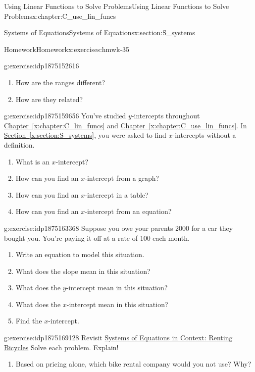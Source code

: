 \documentclass[oneside,10pt,]{book}
\newcommand{\xreffont}{\relax}
\numberwithin{equation}{chapter}
\begin{document}
\begin{chapterptx}{Using Linear Functions to Solve Problems}{}{Using Linear Functions to Solve Problems}{}{}{x:chapter:C_use_lin_funcs}
\begin{sectionptx}{Systems of Equations}{}{Systems of Equations}{}{}{x:section:S_systems}
\begin{exercises-subsection}{Homework}{}{Homework}{}{}{x:exercises:hmwk-35}
\begin{divisionexercise}{5}{}{}{g:exercise:idp1875152616}
\begin{enumerate}[font=\bfseries,label=(\alph*),ref=\alph*]
\item{}How are the ranges different?%
\item{}How are they related?%
\end{enumerate}
\end{divisionexercise}%
\begin{divisionexercise}{6}{}{}{g:exercise:idp1875159656}%
You've studied \(y\)-intercepts throughout \hyperref[x:chapter:C_lin_funcs]{Chapter~{\xreffont\ref{x:chapter:C_lin_funcs}}} and \hyperref[x:chapter:C_use_lin_funcs]{Chapter~{\xreffont\ref{x:chapter:C_use_lin_funcs}}}. In \hyperref[x:section:S_systems]{Section~{\xreffont\ref{x:section:S_systems}}}, you were asked to find \(x\)-intercepts without a definition.%
\begin{enumerate}[font=\bfseries,label=(\alph*),ref=\alph*]
\item{}What is an \(x\)-intercept?%
\item{}How can you find an \(x\)-intercept from a graph?%
\item{}How can you find an \(x\)-intercept in a table?%
\item{}How can you find an \(x\)-intercept from an equation?%
\end{enumerate}
\end{divisionexercise}%
\begin{divisionexercise}{7}{}{}{g:exercise:idp1875163368}%
Suppose you owe your parents \textdollar{}2000 for a car they bought you. You're paying it off at a rate of \textdollar{}100 each month.%
\begin{enumerate}[font=\bfseries,label=(\alph*),ref=\alph*]
\item{}Write an equation to model this situation.%
\item{}What does the slope mean in this situation?%
\item{}What does the \(y\)-intercept mean in this situation?%
\item{}What does the \(x\)-intercept mean in this situation?%
\item{}Find the \(x\)-intercept.%
\end{enumerate}
\end{divisionexercise}%
\begin{divisionexercise}{8}{}{}{g:exercise:idp1875169128}%
Revisit \hyperref[x:worksheet:act-rent-bikes]{Systems of Equations in Context: Renting Bicycles} Solve each problem. Explain!%
\begin{enumerate}[font=\bfseries,label=(\alph*),ref=\alph*]
\item{}Based on pricing alone, which bike rental company would you not use? Why?%

\end{enumerate}
\end{divisionexercise}
\end{exercises-subsection}
\end{sectionptx}
\end{chapterptx}
\end{document}

